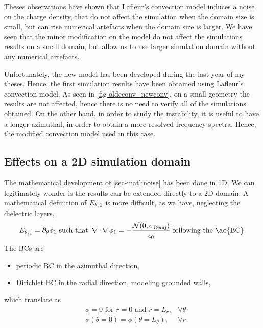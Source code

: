       Theses observations have shown that Lafleur's convection model induces a noise on the charge density, that do not affect the simulation when the domain size is small, but can rise numerical artefacts when the domain size is larger.
      We have seen that the minor modification on the model do not affect the simulations results on a small domain, but allow us to use larger simulation domain without any numerical artefacts.
      
      Unfortunately, the new model has been developed during the last year of my theses.
      Hence, the first simulation results have been obtained using Lafleur's convection model.
      As seen in \cref{fig-oldeconv_newconv}, on a small geometry the results are not affected, hence there is no need to verify all of the simulations obtained.
      On the other hand, in order to study the instability, it is useful to have a longer azimuthal, in order to obtain a more resolved frequency spectra.
      Hence, the modified convection model  used in this case.
          
    \subsection{Effects on a \ac{2D} simulation domain}
      
      The mathematical development of \cref{sec-mathnoise} has been done in \ac{1D}.
      We can legitimately wonder is the results  can be extended directly to a \ac{2D} domain.
      A mathematical definition of ${E_{\theta}}_{, 1}$ is more difficult, as we have, neglecting the dielectric layers,
      \begin{equation} \label{eq-aziE}
        \aziE_{, 1} = \partial_{\theta} \phi_1 \text{ such that } \grad \cdot \grad \phi_1 = - \frac { \N(0, \stdconv)}{\epsilon_0} \text{ following the \ac{BC}}.
      \end{equation}
      The \ac{BC}s are
      \begin{itemize}
        \item periodic \ac{BC} in the azimuthal direction,
        \item Dirichlet \ac{BC} in the radial direction, modeling grounded walls,
      \end{itemize}
      which translate as
      \begin{align}
        &\phi = 0 \text{ for } r=0 \text{ and } r=L_r, &\forall \theta \label{eq-BC1} \\
        &\phi(\theta = 0)= \phi(\theta = L_{\theta}) , &\forall r \label{eq-BC2}
      \end{align}
      
